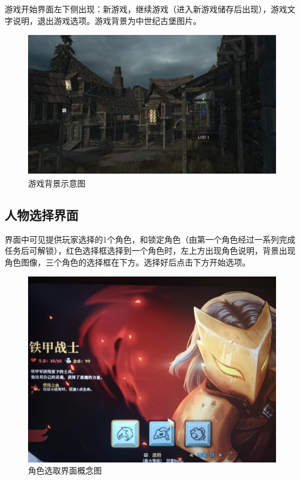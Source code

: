 \documentclass[UTF8,AutoFakeBold=1,AutoFakeSlant,zihao=-4]{cucthesis}
\begin{document}
游戏开始界面左下侧出现：新游戏，继续游戏（进入新游戏储存后出现），游戏文字说明，退出游戏选项。游戏背景为中世纪古堡图片。

\begin{figure}[ht]
    \centering
    \includegraphics[scale=0.8]{imgs/游戏背景.png}    
    \caption{游戏背景示意图}
\end{figure}

\subsection{人物选择界面}

界面中可见提供玩家选择的1个角色，和锁定角色（由第一个角色经过一系列完成任务后可解锁），红色选择框选择到一个角色时，左上方出现角色说明，背景出现角色图像，三个角色的选择框在下方。选择好后点击下方开始选项。

\begin{figure}[ht]
    \centering
    \includegraphics[scale=0.64]{imgs/角色选取.jpg}    
    \caption{角色选取界面概念图}
\end{figure}
\end{document}
